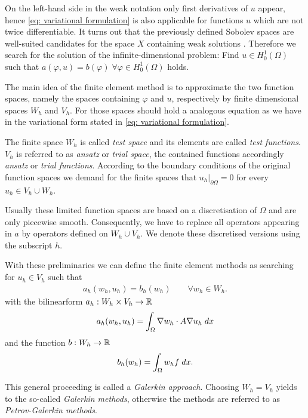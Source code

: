 On the left-hand side in the weak notation only first derivatives of $u$ appear, hence \eqref{eq: variational formulation} is also applicable for functions $u$ which are not twice differentiable. It turns out that the previously defined Sobolev spaces are well-suited candidates for the space $X$ containing weak solutions \cite[Chapter 1]{BS2002}. Therefore we search for the solution of the infinite-dimensional problem: Find $u\in H_0^1(\Omega)$ such that  $a(\varphi,u)  = b(\varphi) \;\forall \varphi \in H_0^1(\Omega)$ holds. %

The main idea of the finite element method is to approximate the two function spaces, namely the spaces containing $\varphi$ and $u$, respectively by finite dimensional spaces $W_h$ and $V_h$. For those spaces should hold a analogous equation as we have in the variational form stated in \eqref{eq: variational formulation}.

The finite space $W_h$ is called \emph{test space} and its elements are called \emph{test functions}. $V_h$ is referred to as \emph{ansatz} or \emph{trial space}, the contained functions accordingly \emph{ansatz} or \emph{trial functions}. According to the boundary conditions of the original function spaces we demand for the finite spaces that $u_h|_{\partial \Omega} = 0$ for every $u_h \in V_h \cup W_h$.

Usually these limited function spaces are based on a discretisation of $\Omega$ and are only piecewise smooth. Consequently, we have to replace all operators appearing in $a$ by operators defined on $W_h \cup V_h$. We denote these discretised versions using the subscript $h$.

With these preliminaries we can define the finite element methods as searching for $u_h \in V_h$ such that 
\begin{align}
a_h(w_h,u_h) = b_h(w_h) \qquad \forall w_h \in W_h. \label{eq: FE variational formulation}
\end{align}
with the bilinearform  $a_h:W_h \times V_h \rightarrow \mathbb{R}$
\begin{align*}
a_h(w_h,u_h)  = \myIntX  \Omega { \nabla w_h  \cdot A\nabla u_h} %
\end{align*}
and the function $b:W_h \rightarrow \mathbb{R}$
\begin{align*}
b_h(w_h) = \int_{\Omega} {{ w_h f}\;dx}.
\end{align*}

This general proceeding is called a \emph{Galerkin approach}. Choosing $W_h = V_h$ yields to the so-called \emph{Galerkin methods}, otherwise the methods are referred to as \emph{Petrov-Galerkin methods}.

